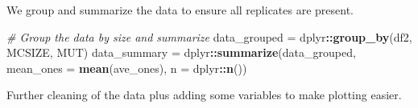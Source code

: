 \documentclass[
]{book}
\newenvironment{Shaded}{\begin{snugshade}}{\end{snugshade}}
\newcommand{\CommentTok}[1]{\textcolor[rgb]{0.56,0.35,0.01}{\textit{#1}}}
\newcommand{\DataTypeTok}[1]{\textcolor[rgb]{0.13,0.29,0.53}{#1}}
\newcommand{\KeywordTok}[1]{\textcolor[rgb]{0.13,0.29,0.53}{\textbf{#1}}}
\newcommand{\NormalTok}[1]{#1}
\newcommand{\OperatorTok}[1]{\textcolor[rgb]{0.81,0.36,0.00}{\textbf{#1}}}
\newcommand{\StringTok}[1]{\textcolor[rgb]{0.31,0.60,0.02}{#1}}
\begin{document}
We group and summarize the data to ensure all replicates are present.

\begin{Shaded}
\begin{Highlighting}[]
\CommentTok{\# Group the data by size and summarize}
\NormalTok{data\_grouped =}\StringTok{ }\NormalTok{dplyr}\OperatorTok{::}\KeywordTok{group\_by}\NormalTok{(df2, MCSIZE, MUT)}
\NormalTok{data\_summary =}\StringTok{ }\NormalTok{dplyr}\OperatorTok{::}\KeywordTok{summarize}\NormalTok{(data\_grouped, }\DataTypeTok{mean\_ones =} \KeywordTok{mean}\NormalTok{(ave\_ones), }\DataTypeTok{n =}\NormalTok{ dplyr}\OperatorTok{::}\KeywordTok{n}\NormalTok{())}
\end{Highlighting}
\end{Shaded}

Further cleaning of the data plus adding some variables to make plotting easier.
\end{document}
